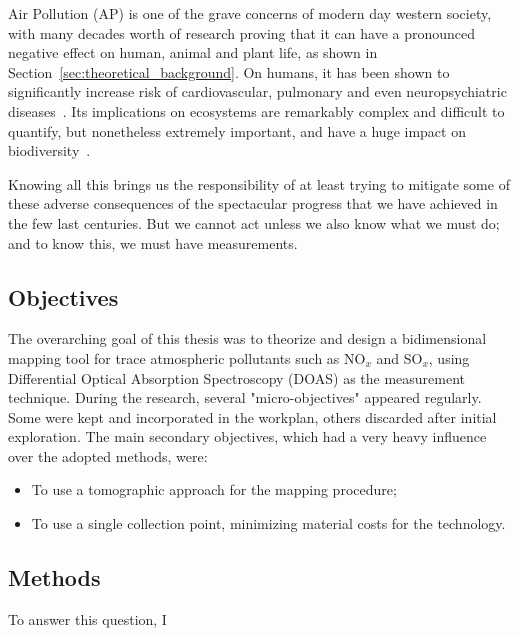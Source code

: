 Air Pollution (\gls{AP}) is one of the grave concerns of modern day
western society, with many decades worth of research proving that it can
have a pronounced negative effect on human, animal and plant life, as
shown in Section~\ref{sec:theoretical_background}. On humans, it has
been shown to significantly increase risk of cardiovascular, pulmonary
and even neuropsychiatric diseases~\cite{Carugno2016, Ghorani-Azam2016,
Kampa2008}. Its implications on ecosystems are remarkably complex and
difficult to quantify, but nonetheless extremely important, and have a
huge impact on biodiversity~\cite{Lovett2009}.

Knowing all this brings us the responsibility of at least trying to
mitigate some of these adverse consequences of the spectacular progress
that we have achieved in the few last centuries. But we cannot act
unless we also know what we must do; and to know this, we must have
measurements.

\subsection{Objectives}%
\label{sub:objectives}

The overarching goal of this thesis was to theorize and design a
bidimensional mapping tool for trace atmospheric pollutants such as
NO$_x$ and SO$_x$, using Differential Optical Absorption Spectroscopy
(\gls{DOAS}) as the measurement technique. During the research, several
"micro-objectives" appeared regularly. Some were kept and incorporated
in the workplan, others discarded after initial exploration. The main
secondary objectives, which had a very heavy influence over the adopted
methods, were:
\begin{itemize}
    \item To use a tomographic approach for the mapping procedure;
    \item To use a single collection point, minimizing material costs
        for the technology.
\end{itemize}


\subsection{Methods}%
\label{sub:methods}

To answer this question, I 

